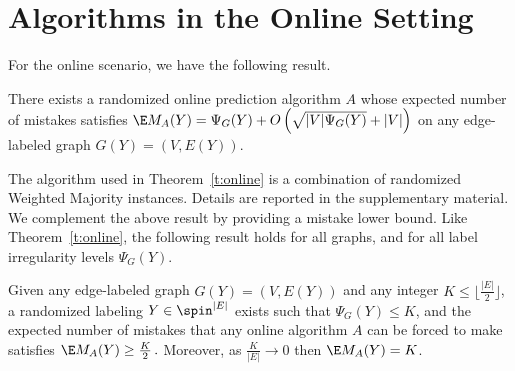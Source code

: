 \section{Algorithms in the Online Setting}\label{s:algonline}

For the online scenario, we have the following result.
%
\begin{theorem}\label{t:online}
There exists a randomized online prediction algorithm $A$ whose expected number of mistakes satisfies
$
\E M_A(Y) = \Psi_G(Y) + O\left(\sqrt{|V|\Psi_G(Y)} + |V| \right)
$
on any edge-labeled graph $G(Y) = (V,E(Y))$.
\end{theorem}
%
The algorithm used in Theorem~\ref{t:online} is a combination of randomized Weighted Majority instances. Details are reported in the supplementary material. We complement the above result by providing a mistake lower bound. Like Theorem~\ref{t:online}, the following result holds for all graphs, and for all label irregularity levels $\Psi_G(Y)$.
%
\begin{theorem}
\label{t:mistake_bound}
Given any edge-labeled graph $G(Y) = (V,E(Y))$ and any integer $K \le \big\lfloor \tfrac{|E|}{2}\big\rfloor$, a randomized labeling $Y\in\spin^{|E|}$ exists such that $\Psi_G(Y) \leq K$, and the expected number of mistakes that any online algorithm $A$ can be forced to make satisfies
\(
\E M_A(Y) \ge \frac{K}{2}\,.
\)
Moreover, as $\frac{K}{|E|} \rightarrow 0$ then
\(
\E M_A(Y) = K
\).
\end{theorem}
%




